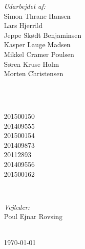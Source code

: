 \begin{titlepage}
		\begin{minipage}{0.4\textwidth}
			\begin{flushleft} \large
				\emph{Udarbejdet af:}\\
				Simon Thrane Hansen \\%
				Lars Hjerrild \\%
				Jeppe Skødt Benjaminsen \\%
				Kasper Lauge Madsen\\ Mikkel Cramer Poulsen\\Søren Kruse Holm\\Morten Christensen
			\end{flushleft}
		\end{minipage}
		~
		\begin{minipage}{0.4\textwidth}
			\begin{flushright} \large
				\ \\
				201500150 \\%
				201409555\\ 	
				201500154\\201409873 	\\20112893 	\\201409556\\ 201500162 	
			\end{flushright}
		\end{minipage}\\[2cm]
		
		
		\begin{minipage}{0.3\textwidth}
			\begin{center} \large
				\emph{Vejleder:} \\
				Poul Ejnar Rovsing	
			\end{center}
		\end{minipage}\\[0.5cm]
	
		
		
		{\large \today}\\[2cm] %
		
	
		
\end{titlepage}
